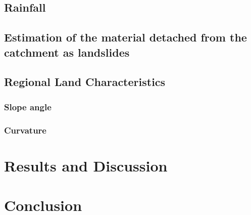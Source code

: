 \documentclass[10pt]{article}
\begin{document}
\subsection{Rainfall}


\subsection{Estimation of the material detached from the catchment as landslides}
\subsection{Regional Land Characteristics}
\subsubsection{Slope angle}
\subsubsection{Curvature}



\section{Results and Discussion}

\section{Conclusion}
\end{document}

